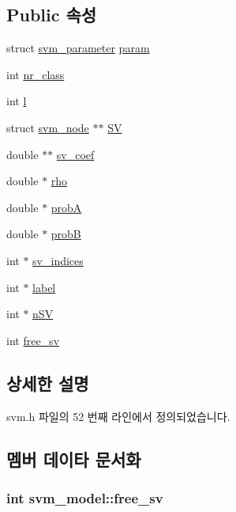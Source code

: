 \subsection*{Public 속성}
\begin{DoxyCompactItemize}
\item 
struct \hyperlink{structsvm__parameter}{svm\+\_\+parameter} \hyperlink{structsvm__model_a95f43f398a173e63d0ce26911d0a9273}{param}
\item 
int \hyperlink{structsvm__model_a5af6e0cfb063e8aac03c99aa9d319116}{nr\+\_\+class}
\item 
int \hyperlink{structsvm__model_ab858d7eed0bd3cc4c33c094872643d0a}{l}
\item 
struct \hyperlink{structsvm__node}{svm\+\_\+node} $\ast$$\ast$ \hyperlink{structsvm__model_a96da6fe173a7150dae95bf55d5539e45}{S\+V}
\item 
double $\ast$$\ast$ \hyperlink{structsvm__model_a978084d722ac886100ffcc35fc931143}{sv\+\_\+coef}
\item 
double $\ast$ \hyperlink{structsvm__model_a16e4dea1508f93ece4384ec35c991887}{rho}
\item 
double $\ast$ \hyperlink{structsvm__model_adf5f28fcdd3ca1c5b23c1f6167710a04}{prob\+A}
\item 
double $\ast$ \hyperlink{structsvm__model_a73ba8feaaf3c2c38c6bb81f7bcb5809e}{prob\+B}
\item 
int $\ast$ \hyperlink{structsvm__model_add7f649bf78428c38a282ed8776fa433}{sv\+\_\+indices}
\item 
int $\ast$ \hyperlink{structsvm__model_ac66d192809e92b95875bdf8ebb749060}{label}
\item 
int $\ast$ \hyperlink{structsvm__model_a1d342c9b9e5e4a6377862e13123a25ef}{n\+S\+V}
\item 
int \hyperlink{structsvm__model_a2ae57ce1fa43497d151aff26c21a13a1}{free\+\_\+sv}
\end{DoxyCompactItemize}


\subsection{상세한 설명}


svm.\+h 파일의 52 번째 라인에서 정의되었습니다.



\subsection{멤버 데이타 문서화}
\hypertarget{structsvm__model_a2ae57ce1fa43497d151aff26c21a13a1}{
\subsubsection[{free\+\_\+sv}]{\setlength{\rightskip}{0pt plus 5cm}int svm\+\_\+model\+::free\+\_\+sv}}\label{structsvm__model_a2ae57ce1fa43497d151aff26c21a13a1}



